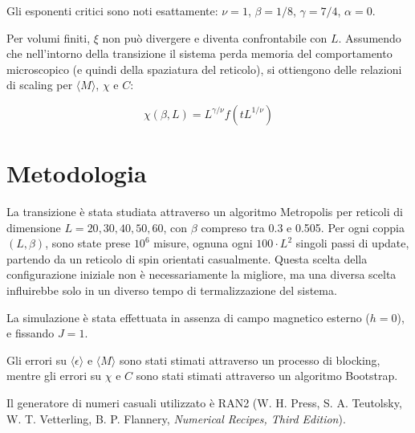 \documentclass[10pt, a4paper, twocolumn]{article}
\newcommand{\avg}[1]{\langle{#1}\rangle}
\begin{document}
		Gli esponenti critici sono noti esattamente: $\nu = 1$, $\beta = 1/8$,
		$\gamma = 7/4$, $\alpha = 0$.

		Per volumi finiti, $\xi$ non può divergere e diventa confrontabile
		con $L$. Assumendo che nell'intorno della transizione il sistema perda
		memoria del comportamento microscopico (e quindi della spaziatura del
		reticolo),
		si ottiengono delle relazioni di scaling per $\avg{M}$, $\chi$ e $C$:

		\begin{subequations}
		  \begin{equation}
			\chi(\beta, L) = L^{\gamma/\nu} f(tL^{1/\nu})
		  \end{equation}
		\end{subequations}

	\section{Metodologia}

	La transizione è stata studiata attraverso un algoritmo Metropolis per
	reticoli di dimensione $L = 20,30,40,50,60$, con $\beta$ compreso tra 0.3 e
	0.505. Per ogni coppia $(L, \beta )$,
	sono state prese $10^{6}$ misure, ognuna ogni $100 \cdot L^{2}$ singoli passi
	di update, partendo da un reticolo di spin orientati casualmente. Questa
	scelta della configurazione iniziale non è necessariamente la migliore, ma
	una diversa scelta influirebbe solo in un diverso tempo di termalizzazione
	del sistema.

	La simulazione è stata effettuata in assenza di campo magnetico esterno
	($h = 0$), e fissando $J = 1$.

	Gli errori su $\avg{\epsilon}$ e $\avg{M}$ sono stati
	stimati attraverso un processo di blocking, mentre gli errori su $\chi$ e $C$ sono stati stimati attraverso un algoritmo Bootstrap.

	Il generatore di numeri casuali utilizzato è RAN2 (W. H. Press, S. A.
	Teutolsky, W. T. Vetterling, B. P. Flannery, \emph{Numerical Recipes, Third Edition}).
\end{document}
